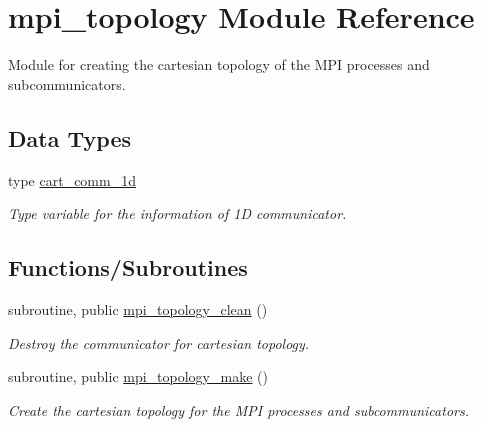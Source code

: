 \hypertarget{namespacempi__topology}{}\section{mpi\+\_\+topology Module Reference}
\label{namespacempi__topology}


Module for creating the cartesian topology of the M\+PI processes and subcommunicators.  


\subsection*{Data Types}
\begin{DoxyCompactItemize}
\item 
type \mbox{\hyperlink{structmpi__topology_1_1cart__comm__1d}{cart\+\_\+comm\+\_\+1d}}
\begin{DoxyCompactList}\small\item\em Type variable for the information of 1D communicator. \end{DoxyCompactList}\end{DoxyCompactItemize}
\subsection*{Functions/\+Subroutines}
\begin{DoxyCompactItemize}
\item 
subroutine, public \mbox{\hyperlink{namespacempi__topology_aa14e91baaec6d1c1082ebd5ac6e19128}{mpi\+\_\+topology\+\_\+clean}} ()
\begin{DoxyCompactList}\small\item\em Destroy the communicator for cartesian topology. \end{DoxyCompactList}\item 
subroutine, public \mbox{\hyperlink{namespacempi__topology_a8819f16f50aded913f17520a29d3ec4c}{mpi\+\_\+topology\+\_\+make}} ()
\begin{DoxyCompactList}\small\item\em Create the cartesian topology for the M\+PI processes and subcommunicators. \end{DoxyCompactList}\end{DoxyCompactItemize}

